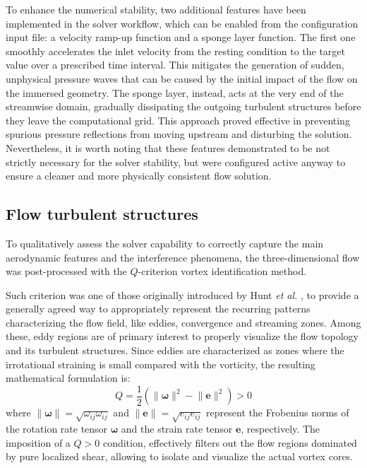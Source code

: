 \documentclass[12pt, a4paper, twoside, openright]{book}
\begin{document}
To enhance the numerical stability, two additional features have been implemented in the solver workflow, which can be enabled from the configuration input file: a velocity ramp-up function and a sponge layer function. The first one smoothly accelerates the inlet velocity from the resting condition to the target value over a prescribed time interval. This mitigates the generation of sudden, unphysical pressure waves that can be caused by the initial impact of the flow on the immersed geometry. The sponge layer, instead, acts at the very end of the streamwise domain, gradually dissipating the outgoing turbulent structures before they leave the computational grid. This approach proved effective in preventing spurious pressure reflections from moving upstream and disturbing the solution. Nevertheless, it is worth noting that these features demonstrated to be not strictly necessary for the solver stability, but were configured active anyway to ensure a cleaner and more physically consistent flow solution.

\subsection{Flow turbulent structures}
To qualitatively assess the solver capability to correctly capture the main aerodynamic features and the interference phenomena, the three-dimensional flow was post-processed with the $Q$-criterion vortex identification method.

Such criterion was one of those originally introduced by Hunt \textit{et al.} \cite{hunt}, to provide a generally agreed way to appropriately represent the recurring patterns characterizing the flow field, like eddies, convergence and streaming zones. Among these, eddy regions are of primary interest to properly visualize the flow topology and its turbulent structures. Since eddies are characterized as zones where the irrotational straining is small compared with the vorticity, the resulting mathematical formulation is:
\begin{equation}
	Q = \frac{1}{2} \left( \lVert \bm{\omega} \rVert^2 - \lVert \bm{e} \rVert^2 \right) > 0
    \label{eq:q-criterion}
\end{equation}
where $\lVert \bm{\omega} \rVert = \sqrt{\omega_{ij} \omega_{ij}}$ and $\lVert \bm{e} \rVert = \sqrt{e_{ij} e_{ij}}$ represent the Frobenius norms of the rotation rate tensor $\bm{\omega}$ and the strain rate tensor $\bm{e}$, respectively. The imposition of a $Q > 0$ condition, effectively filters out the flow regions dominated by pure localized shear, allowing to isolate and visualize the actual vortex cores.
\end{document}
